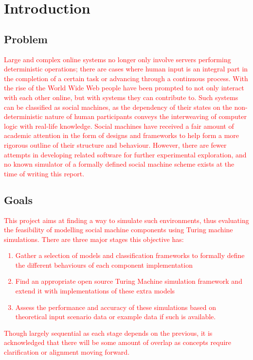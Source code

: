\documentclass[12pt,a4,xcolor=table]{article}
\begin{document}
	\section{Introduction}
	\subsection{Problem}
	\textcolor{red}{
		Large and complex online systems no longer only involve servers performing deterministic operations; there are cases where human input is an integral part in the completion of a certain task or advancing through a continuous process. With the rise of the World Wide Web people have been prompted to not only interact with each other online, but with systems they can contribute to. Such systems can be classified as social machines, as the dependency of their states on the non-deterministic nature of human participants conveys the interweaving of computer logic with real-life knowledge.
		Social machines have received a fair amount of academic attention in the form of designs and frameworks to help form a more rigorous outline of their structure and behaviour. However, there are fewer attempts in developing related software for further experimental exploration, and no known simulator of a formally defined social machine scheme exists at the time of writing this report.
	}
	\subsection{Goals}
	\textcolor{red}{
		This project aims at finding a way to simulate such environments, thus evaluating the feasibility of modelling social machine components using Turing machine simulations.
		There are three major stages this objective has:
		\begin{enumerate}[label=\textit{Stage \arabic*}]
			\item Gather a selection of models and classification frameworks to formally define the different behaviours of each component implementation
			\item Find an appropriate open source Turing Machine simulation framework and extend it with implementations of these extra models
			\item Assess the performance and accuracy of these simulations based on theoretical input scenario data or example data if such is available.
		\end{enumerate}
		Though largely sequential as each stage depends on the previous, it is acknowledged that there will be some amount of overlap as concepts require clarification or alignment moving forward.
	}
\end{document}

